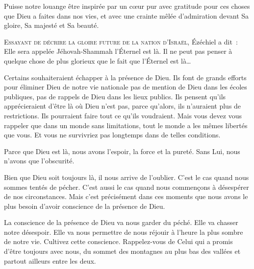 Puisse notre louange être inspirée par un cœur pur
 \ocadr avec gratitude pour ces choses que Dieu a faites dans nos vies, 
et avec une crainte mêlée d'admiration devant Sa gloire,
 Sa majesté et Sa beauté. 

\dvrule






\lettrine{E}{ssayant de décrire la gloire future de la nation d'Israël,}
 Ézéchiel a dit~: 
 \og Elle sera appelée Jéhovah-Shammah \ocadr l'Éternel est là. \fg{}
 Il ne peut pas penser à quelque chose de plus glorieux
 que le fait que l'Éternel est là\dots{}

Certains souhaiteraient échapper à la présence de Dieu.
 Ils font de grands efforts pour éliminer Dieu de notre vie nationale
 \ocadr pas de mention de Dieu dans les écoles publiques,
 pas de rappels de Dieu dans les lieux publics.
 Ils pensent qu'ils apprécieraient d'être là où Dieu n'est pas,
 parce qu'alors, ils n'auraient plus de restrictions.
 Ils pourraient faire tout ce qu'ils voudraient.
 Mais vous devez vous rappeler que dans un monde sans limitations,
 tout le monde a les mêmes libertés que vous.
 Et vous ne survivriez pas longtemps dans de telles conditions. 


Parce que Dieu est là, nous avons l'espoir, la force et la pureté.
 Sans Lui, nous n'avons que l'obscurité. 

Bien que Dieu soit toujours là, il nous arrive de l'oublier.
 C'est le cas quand nous sommes tentés de pécher.
 C'est aussi le cas quand nous commençons à désespérer de nos circonstances.
 Mais c'est précisément dans ces moments que nous avons le plus besoin
 d'avoir conscience de la présence de Dieu. 

La conscience de la présence de Dieu va nous garder du péché.
 Elle va chasser notre désespoir. Elle va nous permettre de nous réjouir
 à l'heure la plus sombre de notre vie. Cultivez cette conscience.
 Rappelez-vous de Celui qui a promis d'être toujours avec nous,
 du sommet des montagnes au plus bas des vallées
 et partout ailleurs entre les deux. 

